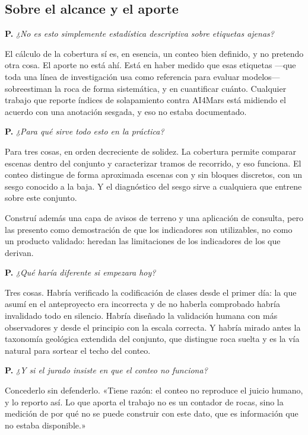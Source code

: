 \documentclass[11pt]{article}
\newcommand{\pregunta}[1]{\medskip\noindent\textbf{\color{rojo}P.}\; \textit{#1}\par}
\begin{document}
\subsection*{Sobre el alcance y el aporte}

\pregunta{¿No es esto simplemente estadística descriptiva sobre etiquetas ajenas?}
\begin{resp}
El cálculo de la cobertura sí es, en esencia, un conteo bien definido, y no pretendo otra
cosa. El aporte no está ahí. Está en haber medido que esas etiquetas —que toda una línea de
investigación usa como referencia para evaluar modelos— sobreestiman la roca de forma
sistemática, y en cuantificar cuánto. Cualquier trabajo que reporte índices de solapamiento
contra AI4Mars está midiendo el acuerdo con una anotación sesgada, y eso no estaba
documentado.
\end{resp}

\pregunta{¿Para qué sirve todo esto en la práctica?}
\begin{resp}
Para tres cosas, en orden decreciente de solidez. La cobertura permite comparar escenas
dentro del conjunto y caracterizar tramos de recorrido, y eso funciona. El conteo distingue
de forma aproximada escenas con y sin bloques discretos, con un sesgo conocido a la baja. Y
el diagnóstico del sesgo sirve a cualquiera que entrene sobre este conjunto.

Construí además una capa de avisos de terreno y una aplicación de consulta, pero las
presento como demostración de que los indicadores son utilizables, no como un producto
validado: heredan las limitaciones de los indicadores de los que derivan.
\end{resp}

\pregunta{¿Qué haría diferente si empezara hoy?}
\begin{resp}
Tres cosas. Habría verificado la codificación de clases desde el primer día: la que asumí
en el anteproyecto era incorrecta y de no haberla comprobado habría invalidado todo en
silencio. Habría diseñado la validación humana con más observadores y desde el principio con
la escala correcta. Y habría mirado antes la taxonomía geológica extendida del conjunto, que
distingue roca suelta y es la vía natural para sortear el techo del conteo.
\end{resp}

\pregunta{¿Y si el jurado insiste en que el conteo no funciona?}
\begin{resp}
Concederlo sin defenderlo. «Tiene razón: el conteo no reproduce el juicio humano, y lo
reporto así. Lo que aporta el trabajo no es un contador de rocas, sino la medición de por
qué no se puede construir con este dato, que es información que no estaba disponible.»
\end{resp}
\end{document}
